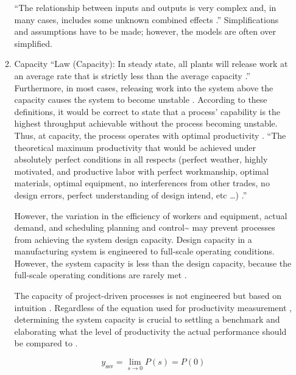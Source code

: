 \documentclass{article}
\begin{document}
\begin{enumerate}
\begin{enumerate}
``The relationship between inputs and outputs is very complex and, in many cases, includes some unknown combined effects \cite{Ok2006}.''
Simplifications and assumptions have to be made; however, the models are often over simplified.

\item Capacity
\label{sec:org51df73c}
``Law (Capacity): In steady state, all plants will release work at an average rate that is strictly less than the average capacity \citep[p.]{Hopp2001}.''
Furthermore, in most cases, releasing work into the system above the capacity causes the system to become unstable \citep{Hopp2001}.
According to these definitions, it would be correct to state that a process' capability is the highest throughput achievable without the process becoming unstable.
Thus, at capacity, the process operates with optimal productivity \citep{Kisi2017}.
``The theoretical maximum productivity that would be achieved under absolutely perfect conditions in all respects (perfect weather, highly motivated, and productive labor with perfect workmanship, optimal materials, optimal equipment, no interferences from other trades, no design errors, perfect understanding of design intend, etc \ldots) \citep[p.150]{Son2011}.''

However, the variation in the efficiency of workers and equipment, actual demand, and scheduling planning and control\textasciitilde{}\cite[p.54]{Kumar2009} may prevent processes from achieving the system design capacity.
Design capacity in a manufacturing system is engineered to full-scale operating conditions.
However, the system capacity is less than the design capacity, because the full-scale operating conditions are rarely met \citep{Kumar2009}.

The capacity of project-driven processes is not engineered but based on intuition \citep{McCray2002,ProjectManagementInstitute2011}.
Regardless of the equation used for productivity measurement \citep{Thomas1990}, determining the system capacity is crucial to settling a benchmark and elaborating what the level of productivity the actual performance should be compared to \citep{Abdel-Razek2007,Olomolaiye1998,Zhao2014}.



\begin{equation}\label{eq:Capacity}
	y_{\mbox{ssv}} = \lim_{s \rightarrow 0} P(s) = P(0)
\end{equation}
\end{enumerate}
\end{enumerate}
\end{document}
